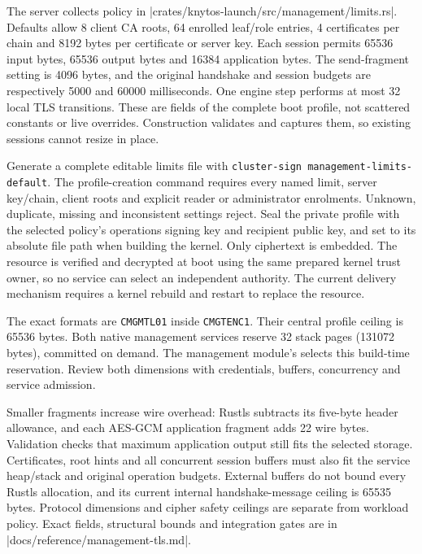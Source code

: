 The server collects policy in
\repofile|crates/knytos-launch/src/management/limits.rs|. Defaults allow 8 client
CA roots, 64 enrolled leaf/role entries, 4 certificates per chain and 8192 bytes
per certificate or server key. Each session permits 65536 input bytes,
65536 output bytes and 16384 application bytes. The send-fragment setting is
4096 bytes, and the original handshake and session budgets are respectively
5000 and 60000 milliseconds. One engine step performs at most 32 local TLS
transitions. These are fields of the complete boot profile, not scattered
constants or live overrides. Construction validates and captures them, so existing
sessions cannot resize in place.

Generate a complete editable limits file with
\texttt{cluster-sign management-limits-default}. The profile-creation command
requires every named limit, server key/chain, client roots and explicit reader
or administrator enrolments. Unknown, duplicate, missing and inconsistent
settings reject. Seal the private profile with the selected policy's operations
signing key and recipient public key, and set
 to its absolute file path when
building the kernel. Only ciphertext is embedded. The resource is verified and
decrypted at boot using the same prepared kernel trust owner, so no service can
select an independent authority. The current delivery mechanism requires a
kernel rebuild and restart to replace the resource.

The exact formats are \texttt{CMGMTL01} inside \texttt{CMGTENC1}. Their central
profile ceiling is 65536 bytes. Both native management services reserve 32 stack
pages (131072 bytes), committed on demand. The management module's
 selects this build-time reservation. Review both
dimensions with credentials, buffers, concurrency and service admission.

Smaller fragments increase wire overhead: Rustls subtracts its five-byte header
allowance, and each AES-GCM application fragment adds 22 wire bytes. Validation
checks that maximum application output still fits the selected storage.
Certificates, root hints and all concurrent session buffers must also fit the
service heap/stack and original operation budgets. External buffers do not bound
every Rustls allocation, and its current internal handshake-message ceiling is
65535 bytes. Protocol dimensions and cipher safety ceilings are separate from
workload policy. Exact fields, structural bounds and integration gates are in
\repofile|docs/reference/management-tls.md|.

